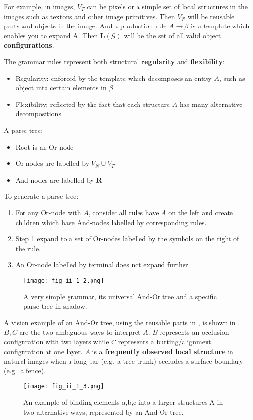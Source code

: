 \documentclass[../Notes_of_CaRiVaC.tex]{subfiles}
\begin{document}
For example, in images, $V_T$ can be pixels or a simple set of local structures
in the images such as textons and other image primitives. Then $V_N$ will be
reusable parts and objects in the image. And a production rule
$A \to \beta$ is a template which enables you to expand A. Then
$\mathbf{L}(\mathcal{G})$ will be the set of all valid object
\textbf{configurations}.

The grammar rules represent both structural \textbf{regularity} and
\textbf{flexibility}:
%
\begin{itemize}
  \item Regularity: enforced by the template which decomposes an entity $A$,
    such as object into certain elements in $\beta$
  \item Flexibility: reflected by the fact that each structure $A$ has many
    alternative decompositions
\end{itemize}
%

A parse tree:
%
\begin{itemize}
  \item Root is an Or-node
  \item Or-nodes are labelled by $V_N \cup V_T$
  \item And-nodes are labelled by $\mathbf{R}$
\end{itemize}
%
To generate a parse tree:
%
\begin{enumerate}
  \item For any Or-node with $A$, consider all rules have $A$ on the left and
    create children which have And-nodes labelled by corresponding rules.
  \item Step 1 expand to a set of Or-nodes labelled by the symbols on the right
    of the rule.
  \item An Or-node labelled by terminal does not expand further.
\end{enumerate}
%
\begin{figure}[!htpb]
  \centering
  \texttt{[image: fig\_ii\_1\_2.png]}
  \caption{A very simple grammar, its universal And-Or tree and a specific
    parse tree in shadow.}%
  \label{fig:ii.1.2}
\end{figure}
%

A vision example of an And-Or tree, using the reusable parts in
, is shown in . $B, C$ are the two ambiguous ways to
interpret $A$. $B$ represents an occlusion configuration with two layers while
$C$ represents a butting/alignment configuration at one layer.  $A$ is a
\textbf{frequently observed local structure} in natural images when a long bar
(e.g.\ a tree trunk) occludes a surface boundary (e.g.\ a fence).
%
\begin{figure}[!htpb]
  \centering
  \texttt{[image: fig\_ii\_1\_3.png]}
  \caption{An example of binding elements a,b,c into a larger structures A in
    two alternative ways, represented by an And-Or tree.}%
  \label{fig:ii.1.3}
\end{figure}
%
\end{document}
